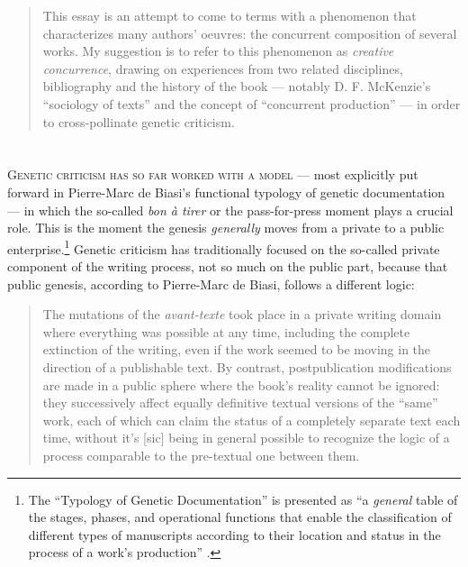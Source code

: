 


\begin{paper}

\begin{abstract}
This essay is an attempt to come to terms with a
phenomenon that characterizes many authors' oeuvres: the concurrent
composition of several works. My suggestion is to refer to this
phenomenon as \emph{creative concurrence}, drawing on experiences from
two related disciplines, bibliography and the history of the book ---
notably D. F. McKenzie's ``sociology of texts'' and the concept of
``concurrent production'' --- in order to cross-pollinate genetic
criticism.
\end{abstract}

\section*{}

\textsc{Genetic criticism has so far worked with a model} --- most explicitly put
forward in Pierre-Marc de Biasi's functional typology of genetic
documentation \citep{biasi_what_1996} --- in which the so-called \emph{bon à
tirer} or the pass-for-press moment plays a crucial role. This is the
moment the genesis \emph{generally} moves from a private to a public
enterprise.\footnote{The ``Typology of Genetic Documentation'' is
  presented as ``a \emph{general} table of the stages, phases, and
  operational functions that enable the classification of different
  types of manuscripts according to their location and status in the
  process of a work's production'' \citep[32; emphasis added]{biasi_what_1996}.}
Genetic criticism has traditionally focused on the so-called private
component of the writing process, not so much on the public part,
because that public genesis, according to Pierre-Marc de Biasi, follows
a different logic:

\begin{quote}
The mutations of the \emph{avant-texte} took place in a private writing
domain where everything was possible at any time, including the complete
extinction of the writing, even if the work seemed to be moving in the
direction of a publishable text. By contrast, postpublication
modifications are made in a public sphere where the book's reality
cannot be ignored: they successively affect equally definitive textual
versions of the ``same'' work, each of which can claim the status of a
completely separate text each time, without it's {[}sic{]} being in general
possible to recognize the logic of a process comparable to the
pre-textual one between them. 
\begin{flushright}
\citep[40]{biasi_what_1996}
\end{flushright}
\end{quote}


\end{paper}
